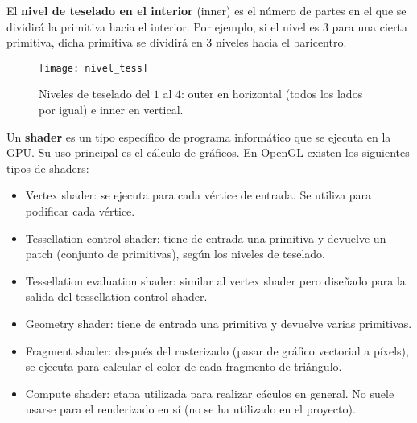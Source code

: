 \begin{definicion} El \textbf{nivel de teselado en el interior} (inner) es el número de partes en el que se dividirá la primitiva hacia el interior. Por ejemplo, si el nivel es $3$ para una cierta primitiva, dicha primitiva se dividirá en $3$ niveles hacia el baricentro.
\end{definicion}

\begin{figure}[h]
  	\centering
  	\texttt{[image: nivel\_tess]}
	\caption{Niveles de teselado del $1$ al $4$: outer en horizontal (todos los lados por igual) e inner en vertical.}
  	\label{fig:nivel_tess}
\end{figure}

\begin{definicion} Un \textbf{shader} es un tipo específico de programa informático que se ejecuta en la GPU. Su uso principal es el cálculo de gráficos. En OpenGL existen los siguientes tipos de shaders:
	\begin{itemize}
		\item Vertex shader: se ejecuta para cada vértice de entrada. Se utiliza para podificar cada vértice.
		\item Tessellation control shader: tiene de entrada una primitiva y devuelve un patch (conjunto de primitivas), según los niveles de teselado.
		\item Tessellation evaluation shader: similar al vertex shader pero diseñado para la salida del tessellation control shader.
		\item Geometry shader: tiene de entrada una primitiva y devuelve varias primitivas.
		\item Fragment shader: después del rasterizado (pasar de gráfico vectorial a píxels), se ejecuta para calcular el color de cada fragmento de triángulo.
		\item Compute shader: etapa utilizada para realizar cáculos en general. No suele usarse para el renderizado en sí (no se ha utilizado en el proyecto).
	\end{itemize}
\end{definicion}

